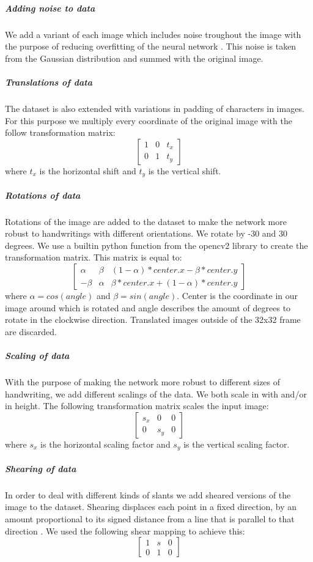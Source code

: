 \documentclass{article}
\begin{document}
\subparagraph{Adding noise to data}
We add a variant of each image which includes noise troughout the image with the purpose of reducing overfitting of the neural network \cite{DataNoise}. This noise is taken from the Gaussian distribution and summed with the original image.  
\subparagraph{Translations of data}
The dataset is also extended with variations in padding of characters in images. For this purpose we multiply every coordinate of the original image with the follow transformation matrix: 
\begin{equation}
        \begin{bmatrix}
                1 & 0 & t_x \\
                0 & 1 & t_y
        \end{bmatrix}
\end{equation}
where $t_x$ is the horizontal shift and $t_y$ is the vertical shift. 
\subparagraph{Rotations of data}
Rotations of the image are added to the dataset to make the network more robust to handwritings with different orientations. We rotate by -30 and 30 degrees. We use a builtin python function from the opencv2 library to create the transformation matrix. This matrix is equal to:
\begin{equation}
       \begin{bmatrix}
               \alpha & \beta & (1-\alpha)*center.x - \beta*center.y \\
               -\beta & \alpha & \beta*center.x + (1-\alpha)*center.y
       \end{bmatrix}
\end{equation}
where $\alpha = cos(angle)$ and $\beta = sin(angle)$. Center is the coordinate in our image around which is rotated and angle describes the amount of degrees to rotate in the clockwise direction. Translated images outside of the 32x32 frame are discarded.
\subparagraph{Scaling of data}
With the purpose of making the network more robust to different sizes of handwriting, we add different scalings of the data. We both scale in with and/or in height. The following transformation matrix scales the input image: 
\begin{equation}
       \begin{bmatrix}
               s_x & 0 & 0  \\
               0 & s_y & 0
       \end{bmatrix}
\end{equation}
where $s_x$ is the horizontal scaling factor and $s_y$ is the vertical scaling factor. 
\subparagraph{Shearing of data}
In order to deal with different kinds of slants we add sheared versions of the image to the dataset. 
Shearing displaces each point in a fixed direction, by an amount proportional to its signed distance from a line that is parallel to that direction \cite{Shear}. We used the following shear mapping to achieve this: 
\begin{equation}
        \begin{bmatrix}
                1 & s & 0 \\
                0 & 1 & 0
        \end{bmatrix}
\end{equation}
\end{document}
